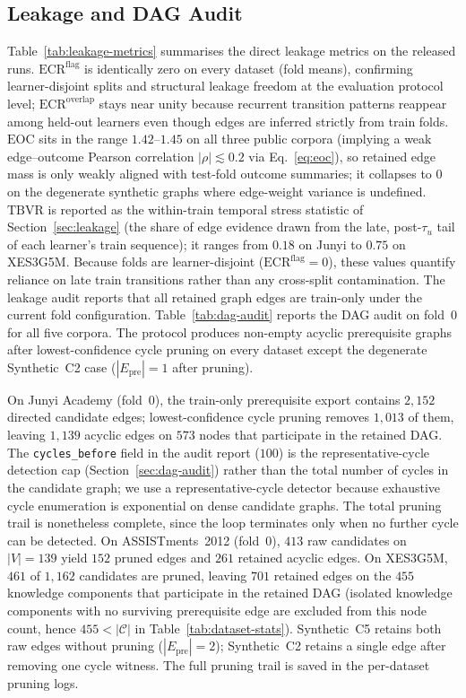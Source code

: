\documentclass[runningheads]{llncs}
\newcommand{\Epre}{\ensuremath{E_{\text{pre}}}}
\newcommand{\KCs}{knowledge components}
\begin{document}
\subsection{Leakage and DAG Audit}
\label{sec:exp-audit}


Table~\ref{tab:leakage-metrics} summarises the direct leakage metrics on
the released runs. $\mathrm{ECR}^{\mathrm{flag}}$ is identically zero on every dataset (fold means), confirming learner-disjoint splits and structural leakage freedom at the evaluation protocol level; $\mathrm{ECR}^{\mathrm{overlap}}$ stays near unity because recurrent transition patterns reappear among held-out learners even though edges are inferred strictly from train folds.
$\mathrm{EOC}$ sits in the range $1.42$--$1.45$ on all three public corpora
(implying a weak edge--outcome Pearson correlation $|\rho|\lesssim0.2$ via
Eq.~\eqref{eq:eoc}), so retained edge mass is only weakly aligned with
test-fold outcome summaries; it collapses to $0$ on the degenerate
synthetic graphs where edge-weight variance is undefined. $\mathrm{TBVR}$
is reported as the within-train temporal stress statistic of
Section~\ref{sec:leakage} (the share of edge evidence drawn from the
late, post-$\tau_u$ tail of each learner's train sequence); it ranges from
$0.18$ on Junyi to $0.75$ on XES3G5M. Because folds are learner-disjoint
($\mathrm{ECR}^{\mathrm{flag}}{=}0$), these values quantify reliance on
late train transitions rather than any cross-split contamination.
The leakage audit reports that all retained graph edges are train-only
under the current fold configuration. Table~\ref{tab:dag-audit} reports
the DAG audit on fold~0 for all five corpora. The protocol produces
non-empty acyclic prerequisite graphs after lowest-confidence cycle
pruning on every dataset except the degenerate Synthetic~C2 case
($|\Epre|{=}1$ after pruning).

On Junyi Academy (fold~0), the train-only prerequisite export contains
$2{,}152$ directed candidate edges; lowest-confidence cycle pruning
removes $1{,}013$ of them, leaving $1{,}139$ acyclic edges on
$573$ nodes that participate in the retained DAG. The
\texttt{cycles\_before} field in the audit report ($100$) is the
representative-cycle detection cap (Section~\ref{sec:dag-audit}) rather
than the total number of cycles in the candidate graph; we use a
representative-cycle detector because exhaustive cycle enumeration is
exponential on dense candidate graphs. The total pruning trail is
nonetheless complete, since the loop terminates only when no further
cycle can be detected. On ASSISTments~2012 (fold~0), $413$ raw
candidates on $|V|{=}139$ yield $152$ pruned edges and $261$ retained
acyclic edges. On XES3G5M, $461$ of $1{,}162$ candidates are pruned,
leaving $701$ retained edges on the $455$ \KCs{} that participate in the
retained DAG (isolated \KCs{} with no surviving prerequisite edge are
excluded from this node count, hence $455<|\mathcal{C}|$ in
Table~\ref{tab:dataset-stats}). Synthetic~C5 retains both
raw edges without pruning ($|\Epre|{=}2$); Synthetic~C2 retains a
single edge after removing one cycle witness. The full pruning trail
is saved in the per-dataset pruning logs.
\end{document}
